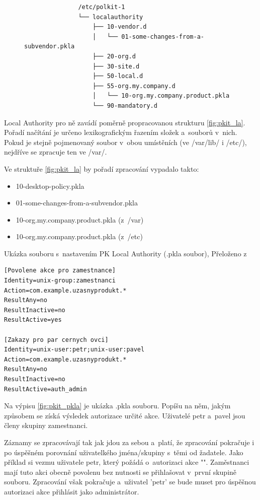 {\begin{figure}[h]
\begin{verbatim}
               /etc/polkit-1
               └── localauthority
                   ├── 10-vendor.d
                   │   └── 01-some-changes-from-a-subvendor.pkla
                   ├── 20-org.d
                   ├── 30-site.d
                   ├── 50-local.d
                   ├── 55-org.my.company.d
                   │   └── 10-org.my.company.product.pkla
                   └── 90-mandatory.d\end{verbatim}
\end{figure}

Local Authority pro ně zavádí poměrně propracovanou strukturu \ref{fig:pkit_la}. Pořadí načítání je určeno lexikografickým řazením složek a~souborů v~nich. Pokud je stejně pojmenovaný soubor v~obou umístěních (ve /var/lib/ i /etc/), nejdříve se zpracuje ten ve /var/.

Ve struktuře \ref{fig:pkit_la} by pořadí zpracování vypadalo takto:
\begin{itemize}
\item 10-desktop-policy.pkla
\item 01-some-changes-from-a-subvendor.pkla
\item 10-org.my.company.product.pkla (z~/var)
\item 10-org.my.company.product.pkla (z~/etc)
\end{itemize}

\begin{mylisting}
\caption{Ukázka souboru s~nastavením PK Local Authority (.pkla soubor), Přeloženo z \cite{pkit_pkla}}
\label{fig:pkit_pkla}
\begin{lstlisting}
[Povolene akce pro zamestnance]
Identity=unix-group:zamestnanci
Action=com.example.uzasnyprodukt.*
ResultAny=no
ResultInactive=no
ResultActive=yes

[Zakazy pro par cernych ovci]
Identity=unix-user:petr;unix-user:pavel
Action=com.example.uzasnyprodukt.*
ResultAny=no
ResultInactive=no
ResultActive=auth_admin
\end{lstlisting}
\end{mylisting}

Na výpisu \ref{fig:pkit_pkla} je ukázka .pkla souboru. Popíšu na něm, jakým způsobem se získá výsledek autorizace určité akce. Uživatelé petr a~pavel jsou členy skupiny zamestnanci.

Záznamy se zpracovávají tak jak jdou za sebou a~platí, že zpracování pokračuje i po úspěšném porovnání uživatelkého jména/skupiny s~těmi od žadatele. Jako příklad si vezmu uživatele petr, který požádá o~autorizaci akce "". Zaměstnanci mají tuto akci obecně povolenu bez nutnosti se přihlašovat v~první skupině souboru. Zpracování však pokračuje a~uživatel 'petr' se bude muset pro úspěšnou autorizaci akce přihlásit jako administrátor.

}
